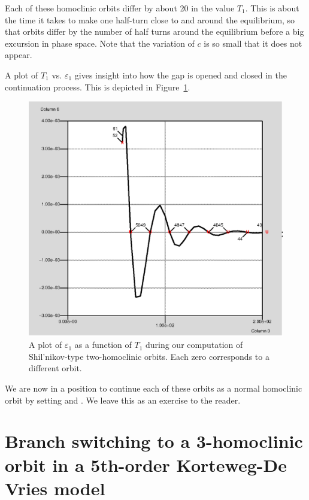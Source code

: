 \documentclass[12pt]{report}
\begin{document}
Each of these homoclinic orbits differ 
by about 20 in the value $T_1$. This is about 
the time it takes to make one half-turn close to and
around the equilibrium, so that orbits differ by the number of 
half turns around the equilibrium before a big excursion
in phase space. Note that the variation of 
$c$ is so small that it does not appear.

A plot of $T_1$ vs. $\varepsilon_1$ gives insight into how the gap
is opened and closed in the continuation process. This is depicted in 
Figure~\ref{shilgap}.
\begin{figure}[htb]
\begin{center}
\includegraphics[scale=0.5]{include/shilgap}
\caption{A plot of $\varepsilon_1$ as a function of $T_1$ 
during our computation of Shil'nikov-type two-homoclinic orbits. 
Each zero corresponds to a different orbit.}
\label{shilgap}
\end{center}
\end{figure}
We are now in a
position to continue each of these orbits as a
normal homoclinic orbit by setting  and
. We leave
this as an exercise to the reader.

\section{ Branch switching to a 3-homoclinic orbit in
a 5th-order Korteweg-De Vries model}
\end{document}
